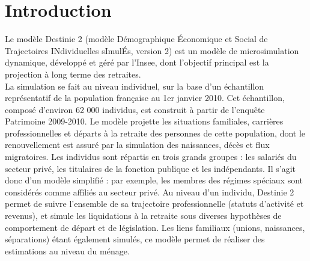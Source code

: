 \section{Introduction}
Le modèle Destinie 2 (modèle Démographique Économique et Social de Trajectoires INdividuelles sImulÉs, version 2) est un modèle de microsimulation dynamique, développé et géré par l'Insee, dont l'objectif principal est la projection à long terme des retraites.\\

La simulation se fait au niveau individuel, sur la base d'un échantillon représentatif de la population française au 1er janvier 2010. Cet échantillon, composé d'environ 62 000 individus, est construit à partir de l'enquête Patrimoine 2009-2010. Le modèle projette les situations familiales, carrières professionnelles et départs à la retraite des personnes de cette population, dont le renouvellement est assuré par la simulation des naissances, décès et flux migratoires. Les individus sont répartis en trois grands groupes : les salariés du secteur privé, les titulaires de la fonction publique et les indépendants. Il s'agit donc d'un modèle simplifié : par exemple, les membres des régimes spéciaux sont considérés comme affiliés au secteur privé. Au niveau d’un individu, Destinie 2 permet de suivre l’ensemble de sa trajectoire professionnelle (statuts d’activité et revenus), et simule les liquidations à la retraite sous diverses hypothèses de comportement de départ et de législation. Les liens familiaux (unions, naissances, séparations) étant également simulés, ce modèle permet de réaliser des estimations au niveau du ménage.\\

